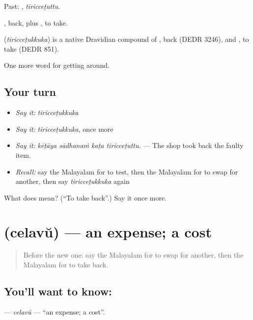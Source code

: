 Past: , \emph{tiricceṭuttu}.

, back, plus , to take.

\begin{cousinweb}
\textbf{} (\emph{tiricceṭukkuka}) is a native Dravidian compound of , back (DEDR 3246), and , to take (DEDR 851).
\end{cousinweb}

\begin{grammarlens}[title={What you've built}]
One more word for getting around.
\end{grammarlens}

\subsection*{Your turn}
\begin{itemize}
\raggedright
  \item \emph{Say it:} \emph{tiricceṭukkuka}
  \item \emph{Say it:} \emph{tiricceṭukkuka}, once more
  \item \emph{Say it:} \emph{kēṭāya sādhanaṁ kaṭa tiricceṭuttu.} — The shop took back the faulty item.
  \item \emph{Recall:} say the Malayalam for to test, then the Malayalam for to swap for another, then say \emph{tiricceṭukkuka} again
\end{itemize}

\begin{tcolorbox}[breakable,colback=teal!4,colframe=teal!35!black,title={Before you move on}]
What does  mean? (\textquotedblleft{}To take back\textquotedblright{}.) Say it once more.
\end{tcolorbox}
\section[\texorpdfstring{\ml{ചെലവ്} (celavŭ)}{ചെലവ് (celavŭ)}]{ (celavŭ) — an expense; a cost}

\label{lesson:ML-C494-celavu}



\begin{quote}
Before the new one: say the Malayalam for to swap for another, then the Malayalam for to take back.
\end{quote}

\subsection*{You'll want to know: }
\textbf{} — \emph{celavŭ} — \textquotedblleft{}an expense; a cost\textquotedblright{}.

